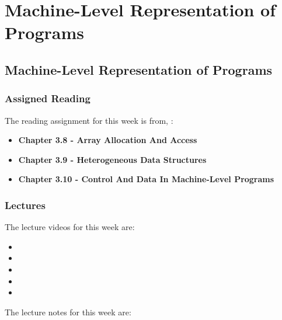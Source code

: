 \clearpage

\renewcommand{\ChapTitle}{Machine-Level Representation of Programs}
\renewcommand{\SectionTitle}{Machine-Level Representation of Programs}

\chapter{\ChapTitle}
\section{\SectionTitle}

\subsection{Assigned Reading}

The reading assignment for this week is from, \Textbook:

\begin{itemize}
    \item \textbf{Chapter 3.8 - Array Allocation And Access}
    \item \textbf{Chapter 3.9 - Heterogeneous Data Structures}
    \item \textbf{Chapter 3.10 - Control And Data In Machine-Level Programs}
\end{itemize}

\subsection{Lectures}

The lecture videos for this week are:

\begin{itemize}
    \item {}
    \item {}
    \item {}
    \item {}
    \item {}
\end{itemize}

\noindent The lecture notes for this week are:

